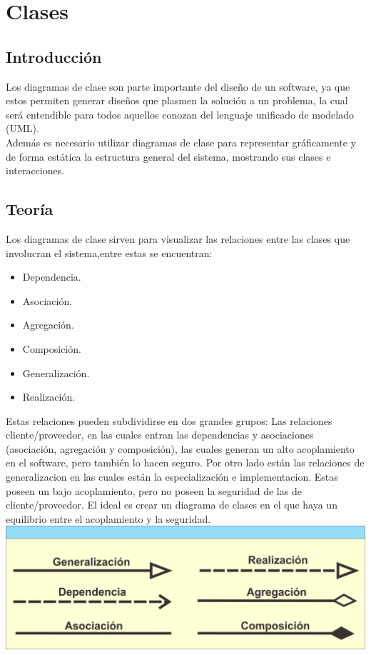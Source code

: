 \chapter{Clases}
\section{Introducción}
Los diagramas de clase son parte importante del diseño de un software, ya que estos permiten generar diseños que plasmen la solución a un problema, la cual será entendible para todos aquellos conozan del lenguaje unificado de modelado (UML).
\\
Además es necesario utilizar diagramas de clase para representar gráficamente y de forma estática la estructura general del sistema, mostrando sus clases e interacciones.
\section{Teoría}
Los diagramas de clase sirven para visualizar las relaciones entre las clases que involucran el sistema,entre estas se encuentran:
\begin{itemize}
\item Dependencia.
\item Asociación.
\item Agregación.
\item Composición.
\item Generalización.
\item Realización.
\end{itemize}

Estas relaciones pueden subdividirse en dos grandes grupos: Las relaciones cliente/proveedor, en las cuales entran las dependencias y asociaciones (asociación, agregación y composición), las cuales generan un alto acoplamiento en el software, pero también lo hacen seguro. Por otro lado están las relaciones de generalizacion en las cuales están la especialización e implementacion. Estas poseen un bajo acoplamiento, pero no poseen la seguridad de las de cliente/proveedor. 
El ideal es crear un diagrama de clases en el que haya un equilibrio entre el acoplamiento y la seguridad.
\includegraphics[scale=0.4]{diseno/clases/imagenes/relaciones.png}  

